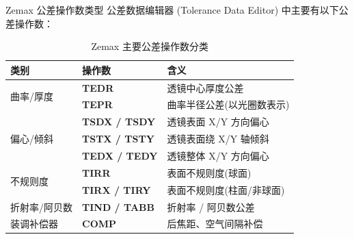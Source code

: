 \begin{frame}{Zemax 公差操作数类型}
    公差数据编辑器 (Tolerance Data Editor) 中主要有以下公差操作数：

    \begin{table}
        \centering
        \small
        \setlength{\tabcolsep}{3pt}
        \begin{tabular}{p{2cm}|p{3.5cm}|p{5cm}}
            \toprule
            \textbf{类别} & \textbf{操作数} & \textbf{含义} \\
            \midrule
            \multirow{2}{*}{曲率/厚度} & \textbf{TEDR} & 透镜中心厚度公差 \\
            & \textbf{TEPR} & 曲率半径公差(以光圈数表示) \\
            \midrule
            \multirow{3}{*}{偏心/倾斜} & \textbf{TSDX / TSDY} & 透镜表面 X/Y 方向偏心 \\
            & \textbf{TSTX / TSTY} & 透镜表面绕 X/Y 轴倾斜 \\
            & \textbf{TEDX / TEDY} & 透镜整体 X/Y 方向偏心 \\
            \midrule
            \multirow{2}{*}{不规则度} & \textbf{TIRR} & 表面不规则度(球面) \\
            & \textbf{TIRX / TIRY} & 表面不规则度(柱面/非球面) \\
            \midrule
            折射率/阿贝数 & \textbf{TIND / TABB} & 折射率 / 阿贝数公差 \\
            \midrule
            装调补偿器 & \textbf{COMP} & 后焦距、空气间隔补偿 \\
            \bottomrule
        \end{tabular}
        \caption{Zemax 主要公差操作数分类}
        \label{tab:tolerance_operands}
    \end{table}
\end{frame}

